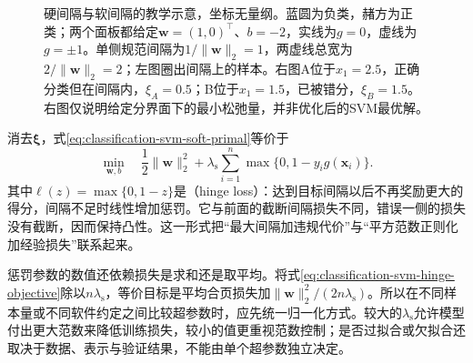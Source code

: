 \begin{figure}[htbp]
  \centering
  
  \caption{硬间隔与软间隔的教学示意，坐标无量纲。蓝圆为负类，赭方为正类；两个面板都给定$\bm{w}=(1,0)^{\top}$、$b=-2$，实线为$g=0$，虚线为$g=\pm1$。单侧规范间隔为$1/\lVert\bm{w}\rVert_2=1$，两虚线总宽为$2/\lVert\bm{w}\rVert_2=2$；左图圈出间隔上的样本。右图A位于$x_1=2.5$，正确分类但在间隔内，$\xi_A=0.5$；B位于$x_1=1.5$，已被错分，$\xi_B=1.5$。右图仅说明给定分界面下的最小松弛量，并非优化后的SVM最优解。}
  \label{fig:classification-svm-margin}
\end{figure}

消去$\bm{\xi}$，式\eqref{eq:classification-svm-soft-primal}等价于
\begin{equation}
  \min_{\bm{w},b}\quad
    \frac12\lVert\bm{w}\rVert_2^2
    +\lambda_{\mathrm{s}}\sum_{i=1}^n
       \max\{0,1-y_i g(\bm{x}_i)\}.
  \label{eq:classification-svm-hinge-objective}
\end{equation}
其中$\ell(z)=\max\{0,1-z\}$是（hinge loss）：达到目标间隔以后不再奖励更大的得分，间隔不足时线性增加惩罚。它与前面的截断间隔损失不同，错误一侧的损失没有截断，因而保持凸性。这一形式把“最大间隔加违规代价”与“平方范数正则化加经验损失”联系起来。

惩罚参数的数值还依赖损失是求和还是取平均。将式\eqref{eq:classification-svm-hinge-objective}除以$n\lambda_{\mathrm{s}}$，等价目标是平均合页损失加$\lVert\bm{w}\rVert_2^2/(2n\lambda_{\mathrm{s}})$。所以在不同样本量或不同软件约定之间比较超参数时，应先统一归一化方式。较大的$\lambda_{\mathrm{s}}$允许模型付出更大范数来降低训练损失，较小的值更重视范数控制；是否过拟合或欠拟合还取决于数据、表示与验证结果，不能由单个超参数独立决定。

